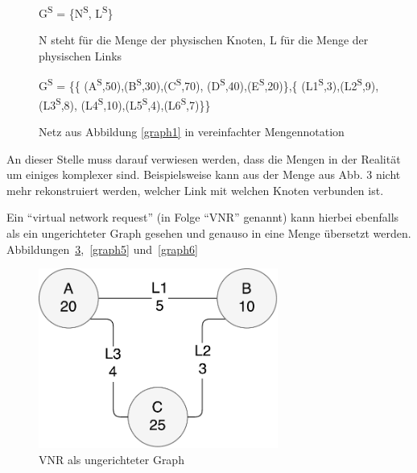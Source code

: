 \documentclass{lni}
\begin{document}
\begin{figure}[htb]
\begin{center}
G\textsuperscript{S} = \{N\textsuperscript{S}, L\textsuperscript{S}\}
\caption{\label{graph2}N steht für die Menge der physischen Knoten, L für die Menge der physischen Links}
\end{center}
\end{figure}

\begin{figure}[htb]
\begin{center}
\hspace{1.0cm}
G\textsuperscript{S} = \{\{
(A\textsuperscript{S},50),(B\textsuperscript{S},30),(C\textsuperscript{S},70),
(D\textsuperscript{S},40),(E\textsuperscript{S},20)\},\newline\{
(L1\textsuperscript{S},3),(L2\textsuperscript{S},9),(L3\textsuperscript{S},8),
(L4\textsuperscript{S},10),(L5\textsuperscript{S},4),(L6\textsuperscript{S},7)\}\}
\caption{\label{graph3} Netz aus Abbildung \ref{graph1} in vereinfachter Mengennotation}
\end{center}
\end{figure}

An dieser Stelle muss darauf verwiesen werden, dass die Mengen in der Realität um einiges komplexer sind. Beispielsweise kann aus der Menge aus Abb. 3 nicht mehr rekonstruiert werden, welcher Link mit welchen Knoten verbunden ist.
\newpage



Ein "`virtual network request"' (in Folge "`VNR"' genannt) kann hierbei ebenfalls als ein ungerichteter Graph gesehen und genauso in eine Menge übersetzt werden. Abbildungen~\ref{graph4},~\ref{graph5} und~\ref{graph6}

\begin{figure}[htb]
\begin{center}
\hspace{0.8cm}
\includegraphics[width=0.7\textwidth]{VNR1.pdf}\newline
\caption{\label{graph4}VNR als ungerichteter Graph}
\end{center}
\end{figure}
\end{document}
